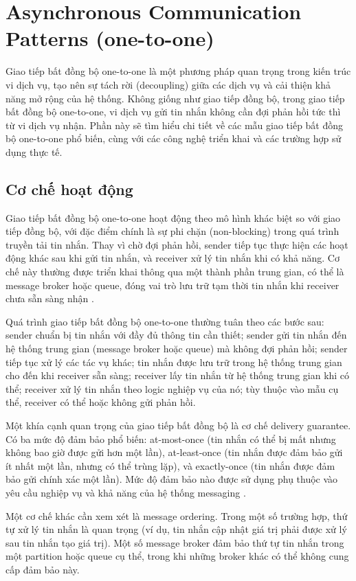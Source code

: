 \section{Asynchronous Communication Patterns (one-to-one)}
Giao tiếp bất đồng bộ one-to-one là một phương pháp quan trọng trong kiến trúc vi dịch vụ, tạo nên sự tách rời (decoupling) giữa các dịch vụ và cải thiện khả năng mở rộng của hệ thống. Không giống như giao tiếp đồng bộ, trong giao tiếp bất đồng bộ one-to-one, vi dịch vụ gửi tin nhắn không cần đợi phản hồi tức thì từ vi dịch vụ nhận. Phần này sẽ tìm hiểu chi tiết về các mẫu giao tiếp bất đồng bộ one-to-one phổ biến, cùng với các công nghệ triển khai và các trường hợp sử dụng thực tế.

\subsection{Cơ chế hoạt động}
Giao tiếp bất đồng bộ one-to-one hoạt động theo mô hình khác biệt so với giao tiếp đồng bộ, với đặc điểm chính là sự phi chặn (non-blocking) trong quá trình truyền tải tin nhắn. Thay vì chờ đợi phản hồi, sender tiếp tục thực hiện các hoạt động khác sau khi gửi tin nhắn, và receiver xử lý tin nhắn khi có khả năng. Cơ chế này thường được triển khai thông qua một thành phần trung gian, có thể là message broker hoặc queue, đóng vai trò lưu trữ tạm thời tin nhắn khi receiver chưa sẵn sàng nhận \cite{hohpe2004}.

Quá trình giao tiếp bất đồng bộ one-to-one thường tuân theo các bước sau: sender chuẩn bị tin nhắn với đầy đủ thông tin cần thiết; sender gửi tin nhắn đến hệ thống trung gian (message broker hoặc queue) mà không đợi phản hồi; sender tiếp tục xử lý các tác vụ khác; tin nhắn được lưu trữ trong hệ thống trung gian cho đến khi receiver sẵn sàng; receiver lấy tin nhắn từ hệ thống trung gian khi có thể; receiver xử lý tin nhắn theo logic nghiệp vụ của nó; tùy thuộc vào mẫu cụ thể, receiver có thể hoặc không gửi phản hồi.

Một khía cạnh quan trọng của giao tiếp bất đồng bộ là cơ chế delivery guarantee. Có ba mức độ đảm bảo phổ biến: at-most-once (tin nhắn có thể bị mất nhưng không bao giờ được gửi hơn một lần), at-least-once (tin nhắn được đảm bảo gửi ít nhất một lần, nhưng có thể trùng lặp), và exactly-once (tin nhắn được đảm bảo gửi chính xác một lần). Mức độ đảm bảo nào được sử dụng phụ thuộc vào yêu cầu nghiệp vụ và khả năng của hệ thống messaging \cite{newman2015}.

Một cơ chế khác cần xem xét là message ordering. Trong một số trường hợp, thứ tự xử lý tin nhắn là quan trọng (ví dụ, tin nhắn cập nhật giá trị phải được xử lý sau tin nhắn tạo giá trị). Một số message broker đảm bảo thứ tự tin nhắn trong một partition hoặc queue cụ thể, trong khi những broker khác có thể không cung cấp đảm bảo này.

